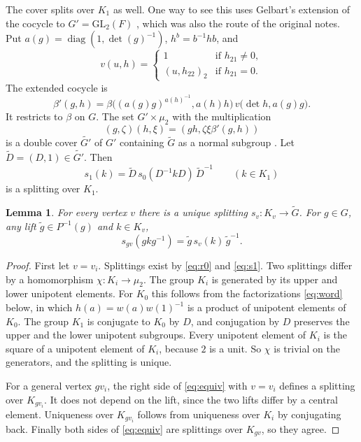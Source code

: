 \documentclass[12pt,letterpaper]{article}
\numberwithin{equation}{section}
\newtheorem{lemma}[theorem]{Lemma}
\theoremstyle{definition}
\theoremstyle{remark}
\newcommand{\Mp}{\widetilde G}
\newcommand{\diag}{\operatorname{diag}}
\begin{document}
The cover splits over $K_1$ as well. One way to see this uses Gelbart's extension of the cocycle to $G'=\mathrm{GL}_2(F)$ \cite{Ge76}, which was also the route of the original notes. Put $a(g)=\diag(1,\det(g)^{-1})$, $h^b=b^{-1}hb$, and
\[
 v(u,h)=
 \begin{cases}1&\text{if } h_{21}\ne0,\\(u,h_{22})_2&\text{if } h_{21}=0.\end{cases}
\]
The extended cocycle is
\begin{equation}\label{eq:betaext}
 \beta'(g,h)=\beta\bigl((a(g)g)^{a(h)^{-1}},a(h)h\bigr)\,
 v\bigl(\det h,a(g)g\bigr).
\end{equation}
It restricts to $\beta$ on $G$. The set $G'\times\mu_2$ with the multiplication
\[
 (g,\zeta)(h,\xi)=(gh,\zeta\xi\beta'(g,h))
\]
is a double cover $\widetilde{G'}$ of $G'$ containing $\Mp$ as a normal subgroup \cite{Ge76}. Let $\widetilde D=(D,1)\in\widetilde{G'}$. Then
\begin{equation}\label{eq:s1}
 s_1(k)=\widetilde D\,s_0(D^{-1}kD)\,\widetilde D^{-1}\qquad(k\in K_1)
\end{equation}
is a splitting over $K_1$.

\begin{lemma}\label{lem:unique}
For every vertex $v$ there is a unique splitting $s_v:K_v\to\Mp$. For $g\in G$, any lift $\widetilde g\in P^{-1}(g)$ and $k\in K_v$,
\begin{equation}\label{eq:equiv}
 s_{gv}(gkg^{-1})=\widetilde g\,s_v(k)\,\widetilde g^{-1}.
\end{equation}
\end{lemma}
\begin{proof}
First let $v=v_i$. Splittings exist by \eqref{eq:r0} and \eqref{eq:s1}. Two splittings differ by a homomorphism $\chi:K_i\to\mu_2$. The group $K_i$ is generated by its upper and lower unipotent elements. For $K_0$ this follows from the factorizations \eqref{eq:word} below, in which $h(a)=w(a)w(1)^{-1}$ is a product of unipotent elements of $K_0$. The group $K_1$ is conjugate to $K_0$ by $D$, and conjugation by $D$ preserves the upper and the lower unipotent subgroups. Every unipotent element of $K_i$ is the square of a unipotent element of $K_i$, because $2$ is a unit. So $\chi$ is trivial on the generators, and the splitting is unique.

For a general vertex $gv_i$, the right side of \eqref{eq:equiv} with $v=v_i$ defines a splitting over $K_{gv_i}$. It does not depend on the lift, since the two lifts differ by a central element. Uniqueness over $K_{gv_i}$ follows from uniqueness over $K_i$ by conjugating back. Finally both sides of \eqref{eq:equiv} are splittings over $K_{gv}$, so they agree.
\end{proof}
\end{document}
